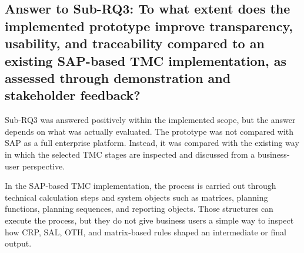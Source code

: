 


\subsection{Answer to Sub-RQ3: To what extent does the implemented prototype improve transparency, usability, and traceability compared to an existing SAP-based TMC implementation, as assessed through demonstration and stakeholder feedback?}

Sub-RQ3 was answered positively within the implemented scope, but the answer depends on what was actually evaluated. The prototype was not compared with SAP as a full enterprise platform. Instead, it was compared with the existing way in which the selected TMC stages are inspected and discussed from a business-user perspective.

In the SAP-based TMC implementation, the process is carried out through technical calculation steps and system objects such as matrices, planning functions, planning sequences, and reporting objects. Those structures can execute the process, but they do not give business users a simple way to inspect how CRP, SAL, OTH, and matrix-based rules shaped an intermediate or final output.

